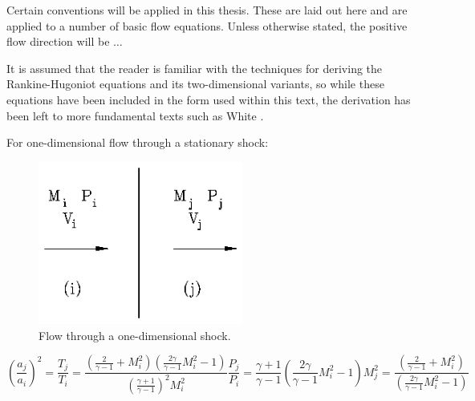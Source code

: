 Certain conventions will be applied in this thesis. These are laid out here and are applied to a
number of basic flow equations. Unless otherwise stated, the positive flow direction will be
$\ldots$

It is assumed that the reader is familiar with the techniques for deriving the Rankine-Hugoniot
equations and its two-dimensional variants, so while these equations have been included in the
form used within this text, the derivation has been left to more fundamental texts such as
White \cite{Knuth1968}.

For one-dimensional flow through a stationary shock:

\begin{figure}[htb]
\begin{center}
\includegraphics[width=0.6\textwidth]{content/figures/1fig6.eps}
\caption{Flow through a one-dimensional shock.}
\label{fig:1fig6}
\end{center}
\end{figure}

\begin{subequations} \label{eq:r-hn}
\begin{equation}
\left( \frac{a_j}{a_i}\right) ^2=\frac{T_j}{T_i}=\frac{\left( \frac2{\gamma-1}+M_i^2\right)
\left( \frac{2\gamma }{\gamma -1}M_i^2-1\right) }{\left( \frac{\gamma +1}{\gamma -1}
\right) ^2M_i^2}  \label{eq:r-hn1}
\end{equation}

\begin{equation}
\frac{P_j}{P_i}=\frac{\gamma +1}{\gamma -1}\left( \frac{2\gamma }{\gamma -1}M_i^2-1
\right)  \label{eq:r-hn2}
\end{equation}

\begin{equation}
M_j^2=\frac{\left( \frac 2{\gamma -1}+M_i^2\right) }{\left( \frac{2\gamma }{\gamma -1}
M_i^2-1\right) }  \label{eq:r-hn3}
\end{equation}
\end{subequations}

